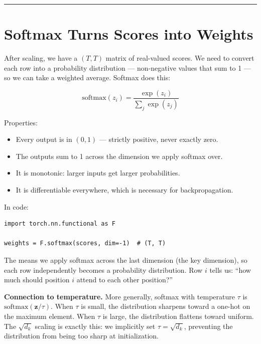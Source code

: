 \bigskip\hrule\bigskip

\section{Softmax Turns Scores into Weights}

After scaling, we have a $(T, T)$ matrix of real-valued scores. We need to convert each row into a probability distribution --- non-negative values that sum to 1 --- so we can take a weighted average. Softmax does this:

\[
\mathrm{softmax}(z_i) = \frac{\exp(z_i)}{\sum_j \exp(z_j)}
\]

Properties:
\begin{itemize}
  \item Every output is in $(0, 1)$ --- strictly positive, never exactly zero.
  \item The outputs sum to 1 across the dimension we apply softmax over.
  \item It is monotonic: larger inputs get larger probabilities.
  \item It is differentiable everywhere, which is necessary for backpropagation.
\end{itemize}

In code:

\demotag
\begin{lstlisting}
import torch.nn.functional as F

weights = F.softmax(scores, dim=-1)  # (T, T)
\end{lstlisting}

The  means we apply softmax across the last dimension (the key dimension), so each row independently becomes a probability distribution. Row $i$ tells us: ``how much should position $i$ attend to each other position?''


\textbf{Connection to temperature.} More generally, softmax with temperature $\tau$ is $\mathrm{softmax}(\mathbf{z} / \tau)$. When $\tau$ is small, the distribution sharpens toward a one-hot on the maximum element. When $\tau$ is large, the distribution flattens toward uniform. The $\sqrt{d_k}$ scaling is exactly this: we implicitly set $\tau = \sqrt{d_k}$, preventing the distribution from being too sharp at initialization.

